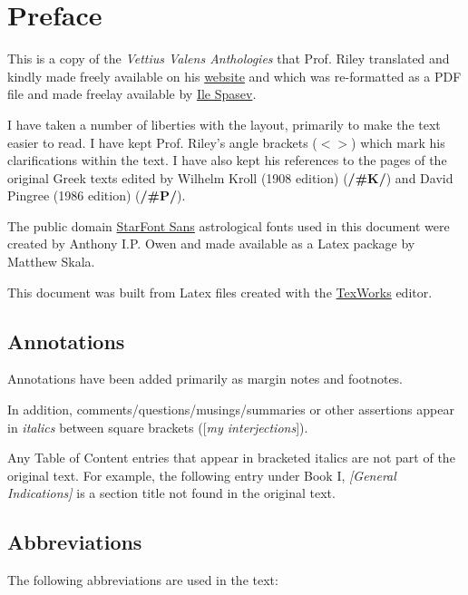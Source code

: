 \chapter{Preface}
This is a copy of the \textit{Vettius Valens Anthologies} that Prof. Riley translated and kindly made freely available on his \href{https://www.csus.edu/indiv/r/rileymt/}{website} and which was re-formatted as a PDF file and made freelay available by \href{https://beyondtheheaven.files.wordpress.com/2019/02/valens-atnhologies-1st-ed.-green.pdf}{Ile Spasev}.

I have taken a number of liberties with the layout, primarily to make the text easier to read. I have kept Prof. Riley's angle brackets ($<>$) which mark his clarifications within the text. I have also kept his references to the pages of the original Greek texts edited by Wilhelm Kroll (1908 edition) (\textbf{/\#K/}) and David Pingree (1986 edition) (\textbf{/\#P/}). 

The public domain \href{https://www.ctan.org/pkg/starfont}{StarFont Sans} astrological fonts used in this document were created by Anthony I.P. Owen and made available as a Latex package by Matthew Skala. 

This document was built from Latex files created with the \href{https://www.tug.org/texworks/}{TexWorks} editor.

\section{Annotations}

Annotations have been added primarily as margin notes and footnotes. 

In addition, comments/questions/musings/summaries or other assertions appear in \textit{italics} between square brackets ([\textit{my interjections}]). 

Any Table of Content entries that appear in bracketed italics are not part of the original text. For example, the following entry under Book I, \textit{[General Indications]} is a section title not found in the original text.

\section{Abbreviations}
The following abbreviations are used in the text:

